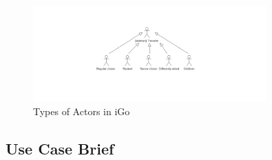 \documentclass[11pt, english]{article}
\begin{document}
 \begin{figure}[H]
  
  \includegraphics[width=0.8\textwidth]{final.png}
  \centering
  \caption{Types of Actors in iGo}

\end{figure}

\subsection{Use Case Brief}
\end{document}
